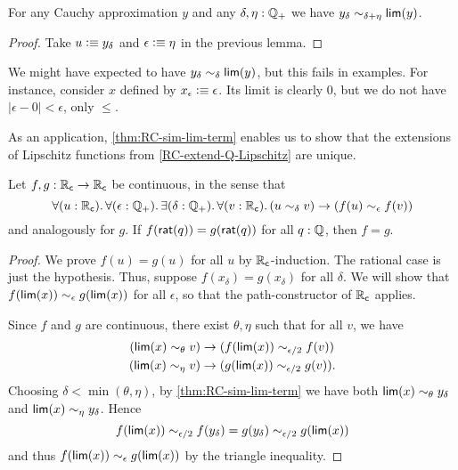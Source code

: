 \begin{lem}\label{thm:RC-sim-lim-term}
  For any Cauchy approximation $y$ and any $\delta,\eta:\mathbb{Q}_{+}$ we have $y_\delta \sim_{\delta+\eta} \mathsf{lim}(y)$.
\end{lem}
\begin{proof}
  Take $u\vcentcolon\equiv y_\delta$ and $\epsilon\vcentcolon\equiv \eta$ in the previous lemma.
\end{proof}

\begin{rmk}
  We might have expected to have $y_\delta \sim_{\delta} \mathsf{lim}(y)$, but this fails in examples.
  For instance, consider $x$ defined by $x_\epsilon \vcentcolon\equiv \epsilon$.
  Its limit is clearly $0$, but we do not have $|\epsilon - 0 |<\epsilon$, only $\le$.
\end{rmk}

As an application, \autoref{thm:RC-sim-lim-term} enables us to show that the extensions of Lipschitz functions from \autoref{RC-extend-Q-Lipschitz} are unique.

\begin{lem}\label{RC-continuous-eq}
  Let $f,g:\mathbb{R}_\mathsf{c}\to\mathbb{R}_\mathsf{c}$ be continuous, in the sense that
  \[ \fall{u:\RC}{\epsilon:\Qp}\exis{\delta:\Qp}\fall{v:\RC} (u\sim_\delta v) \to (f(u) \sim_\epsilon f(v)) \]
  and analogously for $g$.
  If $f(\mathsf{rat}(q))=g(\mathsf{rat}(q))$ for all $q:\mathbb{Q}$, then $f=g$.
\end{lem}
\begin{proof}
  We prove $f(u)=g(u)$ for all $u$ by $\mathbb{R}_\mathsf{c}$-induction.
  The rational case is just the hypothesis.
  Thus, suppose $f(x_\delta)=g(x_\delta)$ for all $\delta$.
  We will show that $f(\mathsf{lim}(x))\sim_\epsilon g(\mathsf{lim}(x))$ for all $\epsilon$, so that the path-constructor of $\mathbb{R}_\mathsf{c}$ applies.

  Since $f$ and $g$ are continuous, there exist $\theta,\eta$ such that for all $v$, we have
  \begin{align*}
    (\mathsf{lim}(x)\sim_\theta v) &\to (f(\mathsf{lim}(x)) \sim_{\epsilon/2} f(v))\\
    (\mathsf{lim}(x)\sim_\eta v) &\to (g(\mathsf{lim}(x)) \sim_{\epsilon/2} g(v)).
  \end{align*}
  Choosing $\delta < \min(\theta,\eta)$, by \autoref{thm:RC-sim-lim-term} we have both $\mathsf{lim}(x)\sim_\theta y_\delta$ and $\mathsf{lim}(x)\sim_\eta y_\delta$.
  Hence
  \[ f(\mathsf{lim}(x)) \sim_{\epsilon/2} f(y_\delta) = g(y_\delta) \sim_{\epsilon/2} g(\mathsf{lim}(x))\]
  and thus $f(\mathsf{lim}(x))\sim_\epsilon g(\mathsf{lim}(x))$ by the triangle inequality.
\end{proof}

